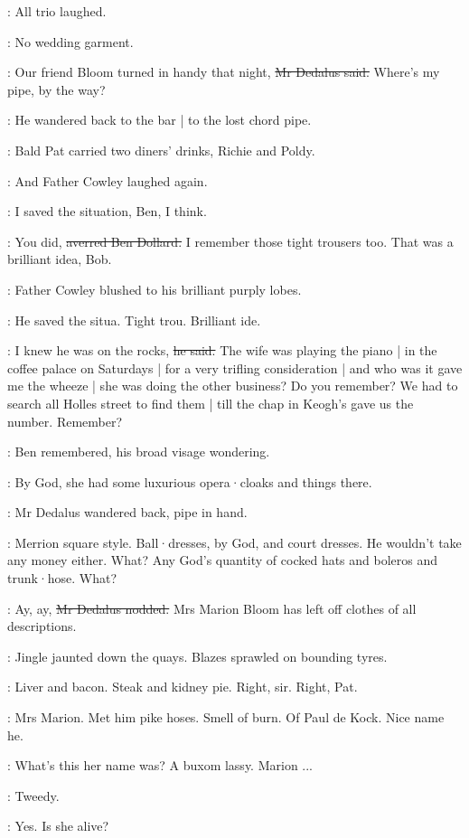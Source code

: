 :
All trio laughed.

\dollard:
No wedding garment.

\simon:
Our friend Bloom turned in handy that night,
\sout{Mr Dedalus said.}
Where's my pipe,
by the way?

:
He wandered back to the bar |
to the lost chord pipe.

:
Bald Pat carried
two diners' drinks,
Richie and Poldy.

:
And Father Cowley laughed again.

\cowley:
I saved the situation,
Ben,
I think.

\dollard:
You did,
\sout{averred Ben Dollard.}
I remember those tight trousers too.
That was a brilliant idea,
Bob.

:
Father Cowley blushed to his brilliant purply lobes.

:
He saved the situa.
Tight trou.
Brilliant ide.

\cowley:
I knew he was on the rocks,
\sout{he said.}
The wife was playing the piano |
in the coffee palace on Saturdays |
for a very trifling consideration |
and who was it gave me the wheeze |
she was doing the other business?
Do you remember?
We had to search all Holles street to find them |
till the chap in Keogh's gave us the number.
Remember?

:
Ben remembered,
his broad visage wondering.

\dollard:
By God,
she had some luxurious opera·cloaks
and things there.

:
Mr Dedalus wandered back,
pipe in hand.

\dollard:
Merrion square style.
Ball·dresses,
by God,
and court dresses.
He wouldn't take any money either.
What?
Any God's quantity of cocked hats
and boleros
and trunk·hose.
What?

\simon:
Ay, ay,
\sout{Mr Dedalus nodded.}
Mrs Marion Bloom has left off clothes
of all descriptions.

:
Jingle jaunted down the quays.
Blazes sprawled on bounding tyres.

:
Liver and bacon.
Steak and kidney pie.
Right, sir.
Right, Pat.

\BloomIntB:
Mrs Marion.
Met him pike hoses.
Smell of burn.
Of Paul de Kock.
Nice name he.

\dollard:
What's this her name was?
A buxom lassy.
Marion ...

\simon:
Tweedy.

\dollard:
Yes.
Is she alive?


